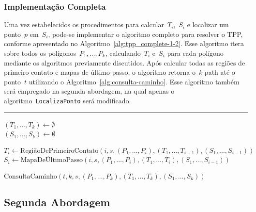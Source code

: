 \documentclass[11pt]{article}
\newcounter{algorithm}
\newcommand{\alglabel}[1]{%
	\refstepcounter{algorithm}%
	\label{#1}%
}
\newcommand{\algref}[1]{\ref{#1}}
\begin{document}
\subsubsection{Implementação Completa}

Uma vez estabelecidos os procedimentos para calcular~\(T_i\),~\(S_i\) e localizar um ponto~\(p\) em~\(S_i\), pode-se implementar o algoritmo completo para resolver o TPP, conforme apresentado no Algoritmo~\algref{alg:tpp_complete-1-2}. Esse algoritmo itera sobre todos os polígonos~\(P_1, \dots, P_k\), calculando~\(T_i\) e~\(S_i\) para cada polígono mediante os algoritmos previamente discutidos. Após calcular todas as regiões de primeiro contato e mapas de último passo, o algoritmo retorna o~\(k\)-path até o ponto~\(t\) utilizando o Algoritmo~\algref{alg:consulta-caminho}. Esse algoritmo também será empregado na segunda abordagem, na qual apenas o algoritmo~\texttt{LocalizaPonto} será modificado.

\begin{algorithm}[!ht]
\alglabel{alg:tpp_complete-1-2}
\caption{TPP Irrestrito — Implementação Completa}

\vspace{0.3em}
\hrule
\vspace{0.3em}

 {

	\((T_1, \dots, T_k) \leftarrow \emptyset\) \\
	\((S_1, \dots, S_k) \leftarrow \emptyset\) \\

	 {
		
		\(T_i \leftarrow \text{RegiãoDePrimeiroContato}(i, s, (P_1, \dots, P_i), (T_1, \dots, T_{i - 1}), (S_1, \dots, S_{i - 1}))\) \\
		\(S_i \leftarrow \text{MapaDeÚltimoPasso}(i, s, (P_1, \dots, P_i), (T_1, \dots, T_i), (S_1, \dots, S_{i - 1}))\)
	}

	\Return {} \(\text{ConsultaCaminho}(t, k, s, (P_1, \dots, P_k), (T_1, \dots, T_k), (S_1, \dots, S_k))\)

}

\end{algorithm}

\subsection{Segunda Abordagem}
\end{document}
